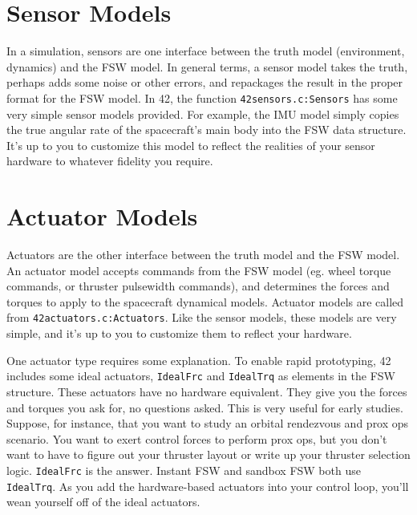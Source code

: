 \documentclass[12pt]{article}
\begin{document}
\section{Sensor Models}

In a simulation, sensors are one interface between the truth model (environment, dynamics) and the FSW model.  In general terms, a sensor model takes the truth, perhaps adds some noise or other errors, and repackages the result in the proper format for the FSW model.  In 42, the function {\tt 42sensors.c:Sensors} has some very simple sensor models provided.  For example, the IMU model simply copies the true angular rate of the spacecraft's main body into the FSW data structure.  It's up to you to customize this model to reflect the realities of your sensor hardware to whatever fidelity you require.

\section{Actuator Models}

Actuators are the other interface between the truth model and the FSW model.  An actuator model accepts commands from the FSW model (eg. wheel torque commands, or thruster pulsewidth commands), and determines the forces and torques to apply to the spacecraft dynamical models.  Actuator models are called from {\tt 42actuators.c:Actuators}.  Like the sensor models, these models are very simple, and it's up to you to customize them to reflect your hardware.

One actuator type requires some explanation.  To enable rapid prototyping, 42 includes some ideal actuators, {\tt IdealFrc} and {\tt IdealTrq} as elements in the FSW structure.  These actuators have no hardware equivalent.  They give you the forces and torques you ask for, no questions asked.  This is very useful for early studies.  Suppose, for instance, that you want to study an orbital rendezvous and prox ops scenario.  You want to exert control forces to perform prox ops, but you don't want to have to figure out your thruster layout or write up your thruster selection logic.  {\tt IdealFrc} is the answer.  Instant FSW and sandbox FSW both use {\tt IdealTrq}.  As you add the hardware-based actuators into your control loop, you'll wean yourself off of the ideal actuators.
\end{document}
